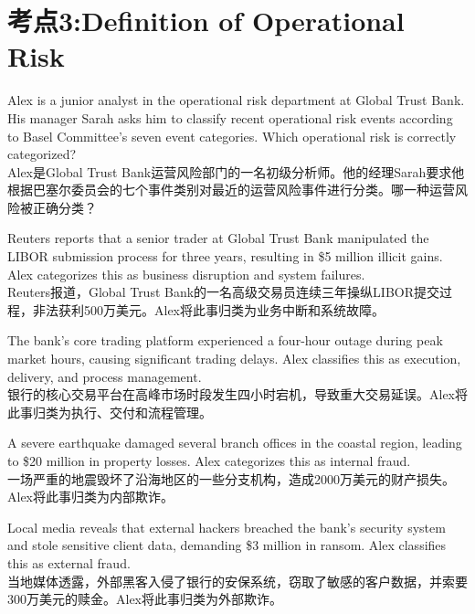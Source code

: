 \documentclass{article}
\newcounter{question} %
\begin{document}
 \tableofcontents %
\newpage







\iftrue
\section{考点3:Definition of Operational Risk}
\setcounter{question}{0}


\begin{question}
    Alex is a junior analyst in the operational risk department at Global Trust Bank. His manager Sarah asks him to classify recent operational risk events according to Basel Committee's seven event categories. Which operational risk is correctly categorized?\\
    Alex是Global Trust Bank运营风险部门的一名初级分析师。他的经理Sarah要求他根据巴塞尔委员会的七个事件类别对最近的运营风险事件进行分类。哪一种运营风险被正确分类？
    \end{question}
    
    \begin{choices}
        \item Reuters reports that a senior trader at Global Trust Bank manipulated the LIBOR submission process for three years, resulting in \$5 million illicit gains. Alex categorizes this as business disruption and system failures.\\
        Reuters报道，Global Trust Bank的一名高级交易员连续三年操纵LIBOR提交过程，非法获利500万美元。Alex将此事归类为业务中断和系统故障。
        
        \item The bank's core trading platform experienced a four-hour outage during peak market hours, causing significant trading delays. Alex classifies this as execution, delivery, and process management.\\
        银行的核心交易平台在高峰市场时段发生四小时宕机，导致重大交易延误。Alex将此事归类为执行、交付和流程管理。
        
        \item A severe earthquake damaged several branch offices in the coastal region, leading to \$20 million in property losses. Alex categorizes this as internal fraud.\\
        一场严重的地震毁坏了沿海地区的一些分支机构，造成2000万美元的财产损失。Alex将此事归类为内部欺诈。
        
        \item Local media reveals that external hackers breached the bank's security system and stole sensitive client data, demanding \$3 million in ransom. Alex classifies this as external fraud.\\
        当地媒体透露，外部黑客入侵了银行的安保系统，窃取了敏感的客户数据，并索要300万美元的赎金。Alex将此事归类为外部欺诈。
    \end{choices}
    
\end{document}
